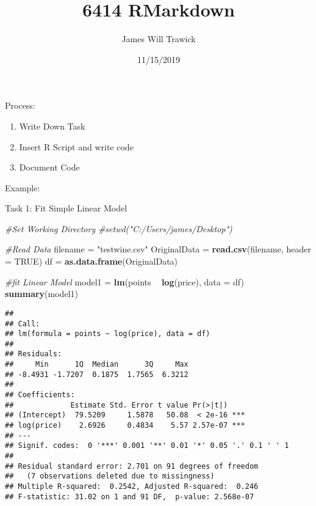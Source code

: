 \documentclass[]{article}
\title{6414 RMarkdown}
\author{James Will Trawick}
\date{11/15/2019}
\newenvironment{Shaded}{\begin{snugshade}}{\end{snugshade}}
\newcommand{\CommentTok}[1]{\textcolor[rgb]{0.56,0.35,0.01}{\textit{#1}}}
\newcommand{\DataTypeTok}[1]{\textcolor[rgb]{0.13,0.29,0.53}{#1}}
\newcommand{\KeywordTok}[1]{\textcolor[rgb]{0.13,0.29,0.53}{\textbf{#1}}}
\newcommand{\NormalTok}[1]{#1}
\newcommand{\OperatorTok}[1]{\textcolor[rgb]{0.81,0.36,0.00}{\textbf{#1}}}
\newcommand{\OtherTok}[1]{\textcolor[rgb]{0.56,0.35,0.01}{#1}}
\newcommand{\StringTok}[1]{\textcolor[rgb]{0.31,0.60,0.02}{#1}}
\providecommand{\tightlist}{%
  \setlength{\itemsep}{0pt}\setlength{\parskip}{0pt}}
\begin{document}
\maketitle

Process:

\begin{enumerate}
\def\labelenumi{\arabic{enumi})}
\tightlist
\item
  Write Down Task
\item
  Insert R Script and write code
\item
  Document Code
\end{enumerate}

Example:

Task 1: Fit Simple Linear Model

\begin{Shaded}
\begin{Highlighting}[]
\CommentTok{#Set Working Directory}
\CommentTok{#setwd("C:/Users/james/Desktop")}

\CommentTok{#Read Data}
\NormalTok{filename =}\StringTok{ "testwine.csv"}
\NormalTok{OriginalData =}\StringTok{ }\KeywordTok{read.csv}\NormalTok{(filename, }\DataTypeTok{header =} \OtherTok{TRUE}\NormalTok{)}
\NormalTok{df =}\StringTok{ }\KeywordTok{as.data.frame}\NormalTok{(OriginalData)}

\CommentTok{#fit Linear Model }
\NormalTok{model1 =}\StringTok{ }\KeywordTok{lm}\NormalTok{(points }\OperatorTok{~}\StringTok{ }\KeywordTok{log}\NormalTok{(price), }\DataTypeTok{data =}\NormalTok{ df)}
\KeywordTok{summary}\NormalTok{(model1)}
\end{Highlighting}
\end{Shaded}

\begin{verbatim}
## 
## Call:
## lm(formula = points ~ log(price), data = df)
## 
## Residuals:
##     Min      1Q  Median      3Q     Max 
## -8.4931 -1.7207  0.1875  1.7565  6.3212 
## 
## Coefficients:
##             Estimate Std. Error t value Pr(>|t|)    
## (Intercept)  79.5209     1.5878   50.08  < 2e-16 ***
## log(price)    2.6926     0.4834    5.57 2.57e-07 ***
## ---
## Signif. codes:  0 '***' 0.001 '**' 0.01 '*' 0.05 '.' 0.1 ' ' 1
## 
## Residual standard error: 2.701 on 91 degrees of freedom
##   (7 observations deleted due to missingness)
## Multiple R-squared:  0.2542, Adjusted R-squared:  0.246 
## F-statistic: 31.02 on 1 and 91 DF,  p-value: 2.568e-07
\end{verbatim}

\begin{Shaded}
\end{Shaded}
\end{document}
